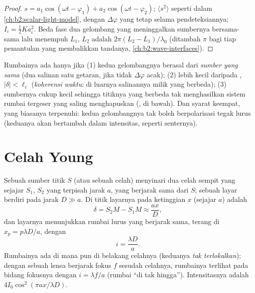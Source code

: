 \begin{proof}
$s = a_1\cos(\omega t - \varphi_1) + a_2\cos(\omega t - \varphi_2)$; $\langle s^2\rangle$ seperti dalam
\cref{ch:b2:scalar-light-model}, dengan $\Delta\varphi$ yang tetap selama
pendeteksiannya; $I_i = \tfrac12Ka_i^2$. Beda fase dua gelombang
yang meninggalkan sumbernya bersama-sama lalu menempuh  $L_1$, $L_2$ adalah
$2\pi(L_2 - L_1)/\lambda_0$ (ditambah $\pi$ bagi tiap pemantulan yang membalikkan
tandanya, \cref{ch:b2:wave-interfaces}).
\end{proof}

\begin{remark}\label{rem:b2:two-wave-interference:conditions}
Rumbainya ada hanya jika (1) kedua gelombangnya berasal dari \emph{sumber
yang sama} (dua salinan satu getaran, jika tidak $\Delta\varphi$ acak); (2)
 lebih kecil daripada , $|\delta| < \ell_c$
(\emph{koherensi waktu}: di luarnya salinannya milik  yang berbeda); (3) sumbernya cukup kecil sehingga titiknya yang berbeda
tak menghasilkan sistem rumbai tergeser yang saling menghapuskan
(\emph{}, di bawah). Dan syarat keempat, yang biasanya terpenuhi: kedua
gelombangnya tak boleh berpolarisasi tegak lurus (keduanya akan bertambah
dalam intensitas, seperti senternya).
\end{remark}

\section{Celah Young}

\begin{proposition}\label{prop:b2:two-wave-interference:young}
Sebuah sumber titik $S$ (atau sebuah celah) menyinari dua celah sempit yang sejajar
$S_1$, $S_2$ yang terpisah jarak $a$, yang berjarak sama dari $S$; sebuah layar berdiri pada
jarak $D \gg a$. Di titik layarnya pada ketinggian $x$ (sejajar
$a$)  adalah
\[
\delta = S_2M - S_1M \approx \frac{ax}D ,
\]
dan layarnya menunjukkan rumbai lurus yang berjarak sama, terang di $x_p =
p\lambda D/a$, dengan \emph{}
\[
i = \frac{\lambda D}a .
\]
Rumbainya ada di mana pun di belakang celahnya (keduanya \emph{tak
terlokalkan}); dengan sebuah lensa berjarak fokus $f$ sesudah celahnya, rumbainya
terlihat pada bidang fokusnya dengan $i = \lambda f/a$ (rumbai ``di tak hingga'').
Intensitasnya adalah $4I_0\cos^2(\pi ax/\lambda D)$.
\end{proposition}


